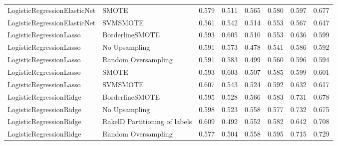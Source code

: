 \begin{tabular}{llllllll}
   LogisticRegressionElasticNet &                         SMOTE & 0.579 &                     0.511 &                 0.565 &                  0.580 &                                   0.597 &     0.677 \\
   LogisticRegressionElasticNet &                      SVMSMOTE & 0.561 &                     0.542 &                 0.514 &                  0.553 &                                   0.567 &     0.647 \\
        LogisticRegressionLasso &               BorderlineSMOTE & 0.593 &                     0.605 &                 0.510 &                  0.553 &                                   0.636 &     0.599 \\
        LogisticRegressionLasso &                 No Upsampling & 0.591 &                     0.573 &                 0.478 &                  0.541 &                                   0.586 &     0.592 \\
        LogisticRegressionLasso &           Random Oversampling & 0.591 &                     0.583 &                 0.499 &                  0.560 &                                   0.596 &     0.594 \\
        LogisticRegressionLasso &                         SMOTE & 0.593 &                     0.603 &                 0.507 &                  0.585 &                                   0.599 &     0.601 \\
        LogisticRegressionLasso &                      SVMSMOTE & 0.607 &                     0.543 &                 0.524 &                  0.592 &                                   0.632 &     0.617 \\
        LogisticRegressionRidge &               BorderlineSMOTE & 0.595 &                     0.528 &                 0.566 &                  0.583 &                                   0.731 &     0.678 \\
        LogisticRegressionRidge &                 No Upsampling & 0.598 &                     0.523 &                 0.558 &                  0.577 &                                   0.732 &     0.675 \\
        LogisticRegressionRidge & RakelD Partitioning of labels & 0.609 &                     0.492 &                 0.552 &                  0.582 &                                   0.642 &     0.708 \\
        LogisticRegressionRidge &           Random Oversampling & 0.577 &                     0.504 &                 0.558 &                  0.595 &                                   0.715 &     0.729 \\

\end{tabular}
